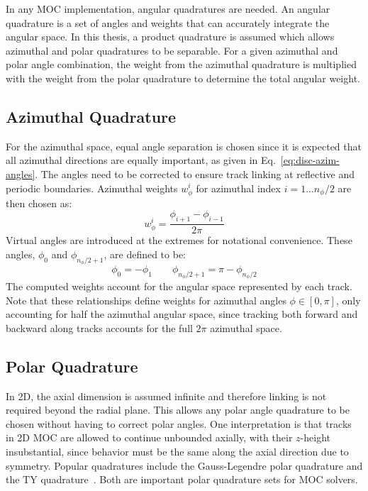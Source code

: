 In any \ac{MOC} implementation, angular quadratures are needed. An angular quadrature is a set of angles and weights that can accurately integrate the angular space. In this thesis, a product quadrature is assumed which allows azimuthal and polar quadratures to be separable. For a given azimuthal and polar angle combination, the weight from the azimuthal quadrature is multiplied with the weight from the polar quadrature to determine the total angular weight.

\subsection{Azimuthal Quadrature}

For the azimuthal space, equal angle separation is chosen since it is expected that all azimuthal directions are equally important, as given in Eq.~\ref{eq:disc-azim-angles}. The angles need to be corrected to ensure track linking at reflective and periodic boundaries. Azimuthal weights $w_{\phi}^i$ for azimuthal index $i=1...{n_\phi/2}$ are then chosen as:
\begin{equation}
w_{\phi}^i = \frac{\phi_{i+1} - \phi_{i-1}}{2\pi}
\end{equation}
Virtual angles are introduced at the extremes for notational convenience. These angles, $\phi_{0}$ and $\phi_{n_\phi/2+1}$, are defined to be:
\begin{equation}
\phi_0 = - \phi_1 \qquad \phi_{n_\phi/2+1} = \pi - \phi_{n_\phi/2}
\end{equation}
The computed weights account for the angular space represented by each track. Note that these relationships define weights for azimuthal angles $\phi \in [0, \pi]$, only accounting for half the azimuthal angular space, since tracking both forward and backward along tracks accounts for the full $2\pi$ azimuthal space.

\subsection{Polar Quadrature}

In 2D, the axial dimension is assumed infinite and therefore linking is not required beyond the radial plane. This allows any polar angle quadrature to be chosen without having to correct polar angles. One interpretation is that tracks in 2D \ac{MOC} are allowed to continue unbounded axially, with their $z$-height insubstantial, since behavior must be the same along the axial direction due to symmetry. Popular quadratures include the Gauss-Legendre polar quadrature and the TY quadrature~\cite{ty-quadrature}. Both are important polar quadrature sets for \ac{MOC} solvers.

